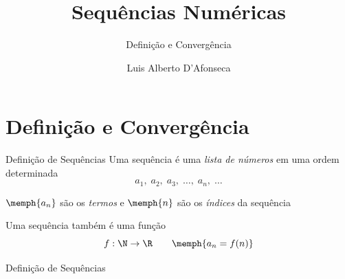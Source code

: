 
\usepackage{apresentacao}
\usepackage{tabto}

\makeatletter
\graphicspath  {{./figs/}}
\makeatother

\newcommand{\mytitle}   {Sequências Numéricas}
\newcommand{\mysubtitle}{Definição e Convergência}
\title   {\mytitle}
\subtitle{\mysubtitle}
\author  {\large Luis Alberto D'Afonseca}
\date    {}



\begin{frame}
    \titlepage
\end{frame}

\section{Definição e Convergência}

\begin{frame}{Definição de Sequências}
    Uma sequência é uma \emph{lista de números} em uma ordem determinada
    \[a_1,\;a_2,\;a_3,\; \dots,\; a_n,\; \dots\]

    \pause
    $\memph{a_n}$ são os \emph{termos} e $\memph{n}$ são os \emph{índices} da sequência

    \pause
    \vspace{\baselineskip}
    Uma sequência também é uma função
    \[f:\N\to\R \qquad \memph{a_n = f(n)}\]
\end{frame}

\begin{frame}{Definição de Sequências}
\begin{columns}
  \scalebox{0.9}{}
  \scalebox{0.9}{}
\end{columns}
\end{frame}

